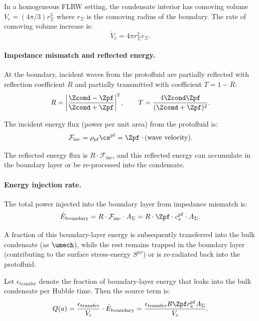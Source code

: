 In a homogeneous FLRW setting, the condensate interior has comoving volume $V_{\mathrm{c}} = (4\pi/3) r_\Sigma^3$ where $r_\Sigma$ is the comoving radius of the boundary. The rate of comoving volume increase is:
\begin{equation}
\dot{V}_{\mathrm{c}} = 4\pi r_\Sigma^2 \dot{r}_\Sigma.
\end{equation}

\paragraph{Impedance mismatch and reflected energy.}

At the boundary, incident waves from the protofluid are partially reflected with reflection coefficient $R$ and partially transmitted with coefficient $T = 1 - R$:
\begin{equation}
R = \left| \frac{\Zcond - \Zpf}{\Zcond + \Zpf} \right|^2, \qquad T = \frac{4\Zcond\Zpf}{(\Zcond + \Zpf)^2}.
\end{equation}

The incident energy flux (power per unit area) from the protofluid is:
\begin{equation}
\mathcal{F}_{\mathrm{inc}} = \rho_{\mathrm{pf}} \cs^{\mathrm{pf}} = \Zpf \cdot (\text{wave velocity}).
\end{equation}

The reflected energy flux is $R \cdot \mathcal{F}_{\mathrm{inc}}$, and this reflected energy can accumulate in the boundary layer or be re-processed into the condensate.

\paragraph{Energy injection rate.}

The total power injected into the boundary layer from impedance mismatch is:
\begin{equation}
\dot{E}_{\mathrm{boundary}} = R \cdot \mathcal{F}_{\mathrm{inc}} \cdot A_\Sigma = R \cdot \Zpf \cdot c_s^{\mathrm{pf}} \cdot A_\Sigma.
\end{equation}

A fraction of this boundary-layer energy is subsequently transferred into the bulk condensate (as $\umech$), while the rest remains trapped in the boundary layer (contributing to the surface stress-energy $S^{\mu\nu}$) or is re-radiated back into the protofluid.

Let $\epsilon_{\mathrm{transfer}}$ denote the fraction of boundary-layer energy that leaks into the bulk condensate per Hubble time. Then the source term is:
\begin{equation}
Q(a) = \frac{\epsilon_{\mathrm{transfer}}}{V_{\mathrm{c}}} \cdot \dot{E}_{\mathrm{boundary}} = \frac{\epsilon_{\mathrm{transfer}} R \Zpf c_s^{\mathrm{pf}} A_\Sigma}{V_{\mathrm{c}}}.
\end{equation}

